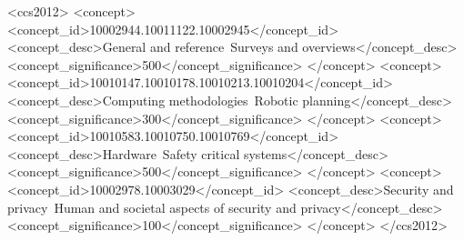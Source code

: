 \documentclass[acmsmall]{acmart}
\begin{document}
\begin{CCSXML}
<ccs2012>
   <concept>
       <concept_id>10002944.10011122.10002945</concept_id>
       <concept_desc>General and reference~Surveys and overviews</concept_desc>
       <concept_significance>500</concept_significance>
       </concept>
   <concept>
       <concept_id>10010147.10010178.10010213.10010204</concept_id>
       <concept_desc>Computing methodologies~Robotic planning</concept_desc>
       <concept_significance>300</concept_significance>
       </concept>
   <concept>
       <concept_id>10010583.10010750.10010769</concept_id>
       <concept_desc>Hardware~Safety critical systems</concept_desc>
       <concept_significance>500</concept_significance>
       </concept>
   <concept>
       <concept_id>10002978.10003029</concept_id>
       <concept_desc>Security and privacy~Human and societal aspects of security and privacy</concept_desc>
       <concept_significance>100</concept_significance>
       </concept>
 </ccs2012>
\end{CCSXML}




\maketitle
\end{document}
